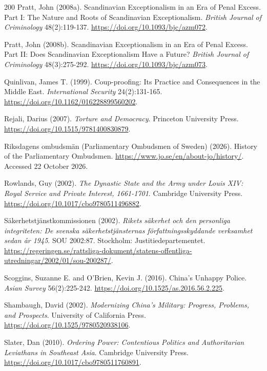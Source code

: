 \documentclass[11pt,letterpaper]{article}
\theoremstyle{definition}
\theoremstyle{remark}
\begin{document}
\begin{thebibliography}{200}
Pratt, John (2008a). Scandinavian Exceptionalism in an Era of Penal Excess. Part I: The Nature and Roots of Scandinavian Exceptionalism. \emph{British Journal of Criminology} 48(2):119-137. \url{https://doi.org/10.1093/bjc/azm072}.

Pratt, John (2008b). Scandinavian Exceptionalism in an Era of Penal Excess. Part II: Does Scandinavian Exceptionalism Have a Future? \emph{British Journal of Criminology} 48(3):275-292. \url{https://doi.org/10.1093/bjc/azm073}.

Quinlivan, James T. (1999). Coup-proofing: Its Practice and Consequences in the Middle East. \emph{International Security} 24(2):131-165. \url{https://doi.org/10.1162/016228899560202}.

Rejali, Darius (2007). \emph{Torture and Democracy}. Princeton University Press. \url{https://doi.org/10.1515/9781400830879}.

Riksdagens ombudsm\"an (Parliamentary Ombudsmen of Sweden) (2026). History of the Parliamentary Ombudsmen. \url{https://www.jo.se/en/about-jo/history/}. Accessed 22 October 2026.

Rowlands, Guy (2002). \emph{The Dynastic State and the Army under Louis XIV: Royal Service and Private Interest, 1661-1701}. Cambridge University Press. \url{https://doi.org/10.1017/cbo9780511496882}.

 S\"akerhetstj\"anstkommissionen (2002). \emph{Rikets s\"akerhet och den personliga integriteten: De svenska s\"akerhetstj\"ansternas f\"orfattningsskyddande verksamhet sedan \aa{}r 1945}. SOU 2002:87. Stockholm: Justitiedepartementet. \url{https://regeringen.se/rattsliga-dokument/statens-offentliga-utredningar/2002/01/sou-200287/}.

Scoggins, Suzanne E. and O'Brien, Kevin J. (2016). China's Unhappy Police. \emph{Asian Survey} 56(2):225-242. \url{https://doi.org/10.1525/as.2016.56.2.225}.

Shambaugh, David (2002). \emph{Modernizing China's Military: Progress, Problems, and Prospects}. University of California Press. \url{https://doi.org/10.1525/9780520938106}.

Slater, Dan (2010). \emph{Ordering Power: Contentious Politics and Authoritarian Leviathans in Southeast Asia}. Cambridge University Press. \url{https://doi.org/10.1017/cbo9780511760891}.


\end{thebibliography}
\end{document}
